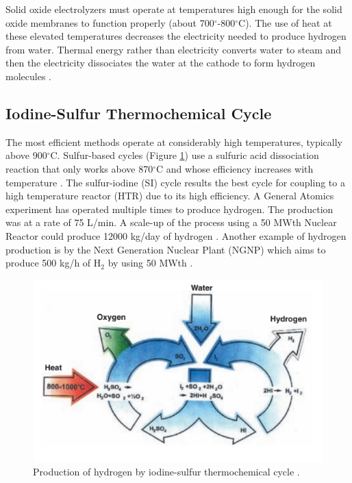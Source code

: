 \documentclass{anstrans}
\begin{document}
Solid oxide electrolyzers must operate at temperatures high enough for the solid oxide membranes to function properly (about 700$^{\circ}$-800$^{\circ}$C). The use of heat at these elevated temperatures decreases the electricity needed to produce hydrogen from water.
Thermal energy rather than electricity converts water to steam and then the electricity dissociates the water at the cathode to form hydrogen molecules \cite{xu_introduction_2017}.

\subsection{Iodine-Sulfur Thermochemical Cycle}

The most efficient methods operate at considerably high temperatures, typically above 900$^{\circ}$C. Sulfur-based cycles (Figure \ref{fig:isulfur}) use a sulfuric acid dissociation reaction that only works above 870$^{\circ}$C and whose efficiency increases with temperature \cite{cea_gas-cooled_2006}. The sulfur-iodine (SI) cycle results the best cycle for coupling to a high temperature reactor (HTR) due to its high efficiency. A General Atomics experiment has operated multiple times to produce hydrogen. The production was at a rate of 75 L/min. A scale-up of the process using a 50 MWth Nuclear Reactor could produce 12000 kg/day of hydrogen \cite{benjamin_russ_sulfur_2009}.
Another example of hydrogen production is by the Next Generation Nuclear Plant (NGNP) \cite{macdonald_ngnp_2003} which aims to produce 500 kg/h of H$_2$ by using 50 MWth \cite{cea_gas-cooled_2006}.

\begin{figure}[]
	\centering
	\includegraphics[width=0.9\linewidth]{figures/iodine-sulfur.png}
	\hfill
	\caption{Production of hydrogen by iodine-sulfur thermochemical cycle \cite{cea_gas-cooled_2006}.}
	\label{fig:isulfur}
\end{figure}
\end{document}
